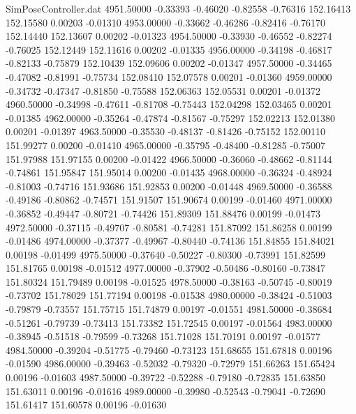 \begin{filecontents}{SimPoseController.dat}
4951.50000   -0.33393   -0.46020    -0.82558   -0.76316  152.16413  152.15580    0.00203   -0.01310
4953.00000   -0.33662   -0.46286    -0.82416   -0.76170  152.14440  152.13607    0.00202   -0.01323
4954.50000   -0.33930   -0.46552    -0.82274   -0.76025  152.12449  152.11616    0.00202   -0.01335
4956.00000   -0.34198   -0.46817    -0.82133   -0.75879  152.10439  152.09606    0.00202   -0.01347
4957.50000   -0.34465   -0.47082    -0.81991   -0.75734  152.08410  152.07578    0.00201   -0.01360
4959.00000   -0.34732   -0.47347    -0.81850   -0.75588  152.06363  152.05531    0.00201   -0.01372
4960.50000   -0.34998   -0.47611    -0.81708   -0.75443  152.04298  152.03465    0.00201   -0.01385
4962.00000   -0.35264   -0.47874    -0.81567   -0.75297  152.02213  152.01380    0.00201   -0.01397
4963.50000   -0.35530   -0.48137    -0.81426   -0.75152  152.00110  151.99277    0.00200   -0.01410
4965.00000   -0.35795   -0.48400    -0.81285   -0.75007  151.97988  151.97155    0.00200   -0.01422
4966.50000   -0.36060   -0.48662    -0.81144   -0.74861  151.95847  151.95014    0.00200   -0.01435
4968.00000   -0.36324   -0.48924    -0.81003   -0.74716  151.93686  151.92853    0.00200   -0.01448
4969.50000   -0.36588   -0.49186    -0.80862   -0.74571  151.91507  151.90674    0.00199   -0.01460
4971.00000   -0.36852   -0.49447    -0.80721   -0.74426  151.89309  151.88476    0.00199   -0.01473
4972.50000   -0.37115   -0.49707    -0.80581   -0.74281  151.87092  151.86258    0.00199   -0.01486
4974.00000   -0.37377   -0.49967    -0.80440   -0.74136  151.84855  151.84021    0.00198   -0.01499
4975.50000   -0.37640   -0.50227    -0.80300   -0.73991  151.82599  151.81765    0.00198   -0.01512
4977.00000   -0.37902   -0.50486    -0.80160   -0.73847  151.80324  151.79489    0.00198   -0.01525
4978.50000   -0.38163   -0.50745    -0.80019   -0.73702  151.78029  151.77194    0.00198   -0.01538
4980.00000   -0.38424   -0.51003    -0.79879   -0.73557  151.75715  151.74879    0.00197   -0.01551
4981.50000   -0.38684   -0.51261    -0.79739   -0.73413  151.73382  151.72545    0.00197   -0.01564
4983.00000   -0.38945   -0.51518    -0.79599   -0.73268  151.71028  151.70191    0.00197   -0.01577
4984.50000   -0.39204   -0.51775    -0.79460   -0.73123  151.68655  151.67818    0.00196   -0.01590
4986.00000   -0.39463   -0.52032    -0.79320   -0.72979  151.66263  151.65424    0.00196   -0.01603
4987.50000   -0.39722   -0.52288    -0.79180   -0.72835  151.63850  151.63011    0.00196   -0.01616
4989.00000   -0.39980   -0.52543    -0.79041   -0.72690  151.61417  151.60578    0.00196   -0.01630

\end{filecontents}
